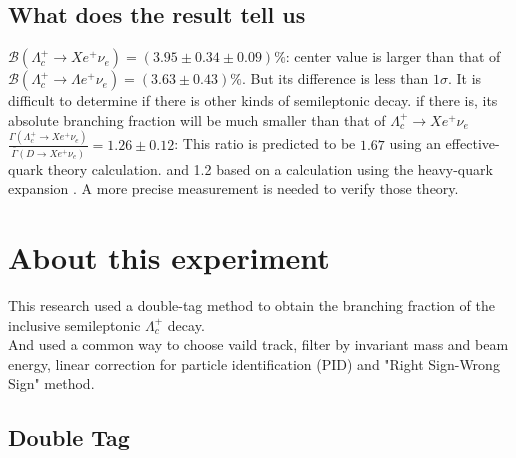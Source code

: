 \documentclass{beamer}
\begin{document}
\subsection{What does the result tell us}
\begin{frame}
    $\mathcal{B}(\Lambda_c^+ \rightarrow X e^+ \nu_e) = (3.95\pm0.34\pm0.09)\%$: center value is larger than that of $\mathcal{B}(\Lambda_c^+ \rightarrow \Lambda e^+ \nu_e)=(3.63 \pm 0.43)\%$. But its difference is less than $1\sigma$.
    It is difficult to determine if there is other kinds of semileptonic decay. if there is, its absolute branching fraction will be much smaller than that of $\Lambda_c^+ \rightarrow X e^+ \nu_e$\\
    \vspace{0.2in}
    $\frac{\Gamma(\Lambda_c^+ \rightarrow X e^+ \nu_e)}{\bar{\Gamma}(D\rightarrow X e^+ \nu_e)}=1.26\pm0.12$: This ratio is predicted to be $1.67$ using an effective-quark theory calculation. \cite{gronau2011ratios} and 1.2 based on a calculation using the heavy-quark expansion \cite{manohar1994inclusive}.
    A more precise measurement is needed to verify those theory.
\end{frame}

\section{About this experiment}
\begin{frame}
    This research used a double-tag method to obtain the branching fraction of the inclusive semileptonic $\Lambda_c^+$ decay. \\
    \vspace{0.2in}
    And used a common way to choose vaild track, filter by invariant mass and beam energy, linear correction for particle identification (PID) and "Right Sign-Wrong Sign" method.
\end{frame}

\subsection{Double Tag}
\end{document}
